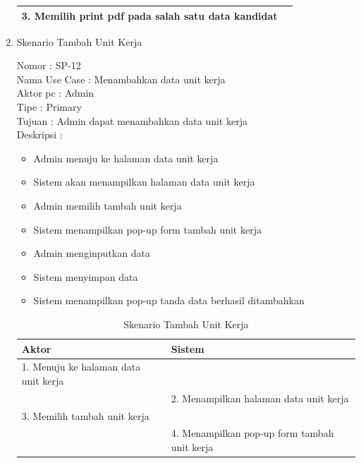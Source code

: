 \begin{enumerate}
\begin{table}
\begin{tabular}{ | p{61.5mm} | p{67mm} |}
		3. Memilih print pdf pada salah satu data kandidat & \\
		
		\hline
	
		
	\end{tabular}
\end{table}

\item Skenario Tambah Unit Kerja

Nomor \kern 3.6pc : SP-12 \\
Nama Use Case : Menambahkan data unit kerja \\
Aktor  pc : Admin \\
Tipe \kern 4.6pc : Primary \\
Tujuan \kern 3.6pc : Admin dapat menambahkan data unit kerja \\
Deskripsi \kern 2.5pc : 

\begin{itemize}
	\item Admin menuju ke halaman data unit kerja
	\item Sistem akan menampilkan halaman data unit kerja
	\item Admin memilih tambah unit kerja
	\item Sistem menampilkan pop-up form tambah unit kerja
	\item Admin menginputkan data
	\item Sistem menyimpan data
	\item Sistem menampilkan pop-up tanda data berhasil ditambahkan
	
\end{itemize}

\begin{table}
	\caption{Skenario Tambah Unit Kerja}
	\centering
	\begin{tabular}{ | l | p{65mm} |}
		\hline 
		\textbf{Aktor} & \textbf{Sistem} \\
		\hline
		
		1.	Menuju ke halaman data unit kerja &  \\
		
		\hline
		
		&  2.	Menampilkan halaman data unit kerja \\
		
		\hline
		
		3. Memilih tambah unit kerja & \\
		
		\hline
		
		& 4.	Menampilkan pop-up form tambah unit kerja \\
		

\end{tabular}
\end{table}
\end{enumerate}
